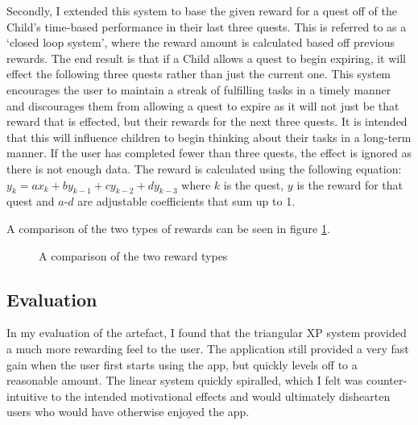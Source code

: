 Secondly, I extended this system to base the given reward for a quest off of the Child's time-based performance in their last three quests.
This is referred to as a `closed loop system', where the reward amount is calculated based off previous rewards.
The end result is that if a Child allows a quest to begin expiring, it will effect the following three quests rather than just the current one.
This system encourages the user to maintain a streak of fulfilling tasks in a timely manner and discourages them from allowing a quest to expire as it will not just be that reward that is effected, but their rewards for the next three quests.
It is intended that this will influence children to begin thinking about their tasks in a long-term manner.
If the user has completed fewer than three quests, the effect is ignored as there is not enough data.
The reward is calculated using the following equation: $y_k = ax_k + by_{k-1} + cy_{k-2} + dy_{k-3}$ where $k$ is the quest, $y$ is the reward for that quest and $a$-$d$ are adjustable coefficients that sum up to 1.
 
A comparison of the two types of rewards can be seen in figure \ref{fig:rewardcomparison}.

\begin{figure}[ht]
\centering
{}
\caption{A comparison of the two reward types}
\label{fig:rewardcomparison}
\end{figure}

\subsection{Evaluation}
In my evaluation of the artefact, I found that the triangular XP system provided a much more rewarding feel to the user. 
The application still provided a very fast gain when the user first starts using the app, but quickly levels off to a reasonable amount.
The linear system quickly spiralled, which I felt was counter-intuitive to the intended motivational effects and would ultimately dishearten users who would have otherwise enjoyed the app.

